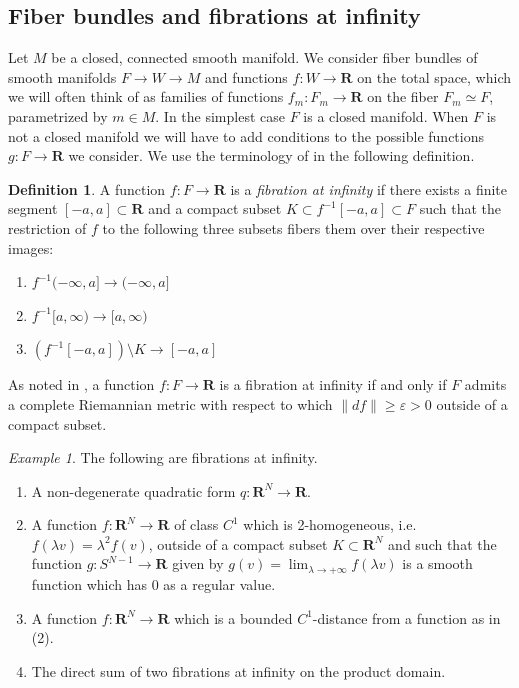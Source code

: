 \documentclass{amsart}
\def\bR{\mathbf{R}}
\theoremstyle{definition}
\newtheorem{definition}[theorem]{Definition}
\theoremstyle{remark}
\newtheorem{example}[theorem]{Example}
\newtheorem{inductive lemma}[theorem]{Inductive Lemma}
\begin{document}
\subsection{Fiber bundles and fibrations at infinity}
Let $M$ be a closed, connected smooth manifold. We consider fiber bundles of smooth manifolds $F \to W \to M$ and functions $f:W \to \bR$ on the total space, which we will often think of as families of functions $f_m:F_m \to \bR$ on the fiber $F_m \simeq F$, parametrized by $m \in M$. In the simplest case $F$ is a closed manifold. When $F$ is not a closed manifold we will have to add conditions to the possible functions $g:F \to \bR$ we consider. %
We use the terminology of \cite{EG98} in the following definition.


\begin{definition}
\label{def: Fibration at Infinity}
A function $f:F \to \bR$ is a  {\em fibration at infinity} if there exists a finite segment $[-a,a] \subset \bR$ and a compact subset $K \subset f^{-1}[-a,a] \subset F$ such that the restriction of $f$ to the following three subsets fibers them over their respective images:
\begin{enumerate}
\item $f^{-1}(-\infty,a] \to (-\infty,a]$
\item $f^{-1}[a,\infty) \to [a,\infty)$
\item $(f^{-1}[-a,a] ) \setminus K \to [-a,a]$
\end{enumerate}
\end{definition}

As noted in \cite[Section 0.2.1]{EG98}, a function $f:F \to \bR$ is a fibration at infinity if and only if $F$ admits a complete Riemannian metric with respect to which $\| df \| \geq \varepsilon>0$ outside of a compact subset.

\begin{example} The following are fibrations at infinity.
\begin{enumerate}
\item A non-degenerate quadratic form $q:\bR^N \to \bR$.
\item A function $f:\bR^N \to \bR$ of class $C^1$ which is 2-homogeneous, i.e. $f(\lambda v) = \lambda^2f(v)$, outside of a compact subset $K \subset \bR^N$ and such that the function $g:S^{N-1} \to \bR$ given by $g(v)=\lim_{\lambda \to +\infty} f(\lambda v)$ is a smooth function which has $0$ as a regular value. 
\item A function $f:\bR^N \to \bR$ which is a bounded $C^1$-distance from a function as in (2). 
\item The direct sum of two fibrations at infinity on the product domain.
\end{enumerate}
\end{example}
\end{document}
